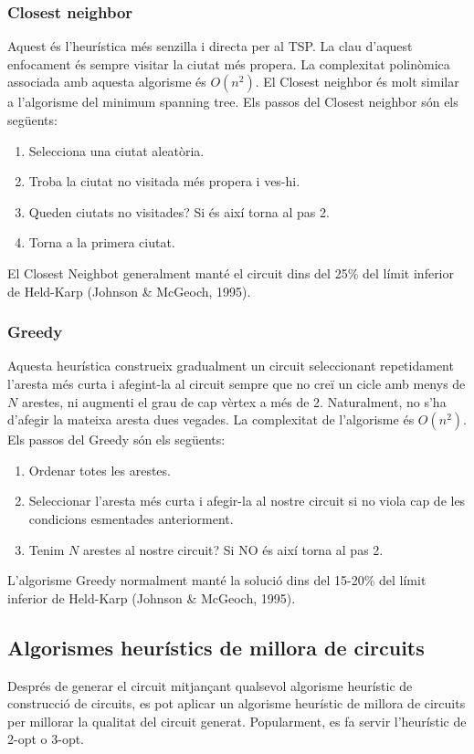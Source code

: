 \documentclass[a4paper,12pt,twoside]{ThesisStyle}
\begin{document}
\subsubsection{Closest neighbor}
\label{ClosestNeighbor}
Aquest és l'heurística més senzilla i directa per al TSP. La clau d'aquest enfocament és sempre visitar la ciutat més propera. La complexitat polinòmica associada amb aquesta algorisme és \( O(n^2) \). El Closest neighbor és molt similar a l'algorisme del minimum spanning tree. Els passos del Closest neighbor són els següents:
\begin{enumerate}
  \item Selecciona una ciutat aleatòria.
  \item Troba la ciutat no visitada més propera i ves-hi.
  \item Queden ciutats no visitades? Si és així torna al pas 2.
  \item Torna a la primera ciutat.
\end{enumerate}
El Closest Neighbot generalment manté el circuit dins del 25\% del límit inferior de Held-Karp (Johnson \& McGeoch, 1995).

\subsubsection{Greedy}
\label{Greedy}
Aquesta heurística construeix gradualment un circuit seleccionant repetidament l'aresta més curta i afegint-la al circuit sempre que no creï un cicle amb menys de \( N \) arestes, ni augmenti el grau de cap vèrtex a més de 2. Naturalment, no s'ha d'afegir la mateixa aresta dues vegades. La complexitat de l'algorisme és \( O(n^2) \). Els passos del Greedy són els següents:
\begin{enumerate}
  \item Ordenar totes les arestes.
  \item Seleccionar l'aresta més curta i afegir-la al nostre circuit si no viola cap de les condicions esmentades anteriorment.
  \item Tenim \( N \) arestes al nostre circuit? Si NO és així torna al pas 2.
\end{enumerate}
L'algorisme Greedy normalment manté la solució dins del 15-20\% del límit inferior de Held-Karp (Johnson \& McGeoch, 1995).


\subsection{Algorismes heurístics de millora de circuits}
\label{AlgorismesHeuristicsMillora}
Després de generar el circuit mitjançant qualsevol algorisme heurístic de construcció de circuits, es pot aplicar un algorisme heurístic de millora de circuits per millorar la qualitat del circuit generat. Popularment, es fa servir l'heurístic de 2-opt o 3-opt.
\end{document}
